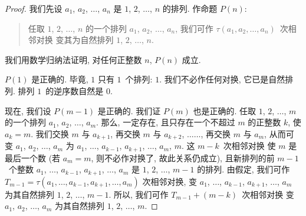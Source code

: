 \begin{proof}
    我们先设 \(a_1\), \(a_2\), \(\dots\), \(a_n\)
    是 \(1\), \(2\), \(\dots\), \(n\) 的排列.
    作命题 \(P(n)\):
    \begin{quotation}
        任取 \(1\), \(2\), \(\dots\), \(n\)
        的一个排列 \(a_1\), \(a_2\), \(\dots\), \(a_n\),
        我们可作 \(\tau (a_1, a_2, \dots, a_n)\)~次相邻对换%
        变其为自然排列 \(1\), \(2\), \(\dots\), \(n\).
    \end{quotation}
    我们用数学归纳法证明,
    对任何正整数 \(n\), \(P(n)\) 成立.

    \(P(1)\) 是正确的.
    毕竟, \(1\) 只有 \(1\)~个排列: \(1\).
    我们不必作任何对换, 它已是自然排列.
    排列 \(1\)~的逆序数自然是 \(0\).

    现在, 我们设 \(P(m-1)\) 是正确的.
    我们证 \(P(m)\) 也是正确的.
    任取 \(1\), \(2\), \(\dots\), \(m\) 的一个排列
    \(a_1\), \(a_2\), \(\dots\), \(a_m\).
    那么, 一定存在, 且只存在一个不超过 \(m\) 的正整数 \(k\),
    使 \(a_k = m\).
    我们交换 \(m\) 与 \(a_{k+1}\),
    再交换 \(m\) 与 \(a_{k+2}\),
    \(\dots \dots\),
    再交换 \(m\) 与 \(a_m\),
    从而可变 \(a_1\), \(a_2\), \(\dots\), \(a_m\)
    为 \(a_1\), \(\dots\), \(a_{k-1}\),
    \(a_{k+1}\), \(\dots\), \(a_m\), \(m\).
    这 \(m - k\)~次相邻对换%
    使 \(m\) 是最后一个数
    (若 \(a_m = m\), 则不必作对换了,
    故此关系仍成立),
    且新排列的前 \(m-1\)~个整数
    \(a_1\), \(\dots\), \(a_{k-1}\),
    \(a_{k+1}\), \(\dots\), \(a_m\)
    是 \(1\), \(2\), \(\dots\), \(m-1\) 的排列.
    由假定, 我们可作
    \(
    T_{m-1} = \tau (a_1, \dots, a_{k-1}, a_{k+1}, \dots, a_m)
    \)
    次相邻对换,
    变 \(a_1\), \(\dots\), \(a_{k-1}\),
    \(a_{k+1}\), \(\dots\), \(a_m\)
    为其自然排列 \(1\), \(2\), \(\dots\), \(m-1\).
    所以, 我们可作 \(T_{m-1} + (m - k)\)~次相邻对换%
    变 \(a_1\), \(a_2\), \(\dots\), \(a_m\)
    为其自然排列 \(1\), \(2\), \(\dots\), \(m\).


\end{proof}
